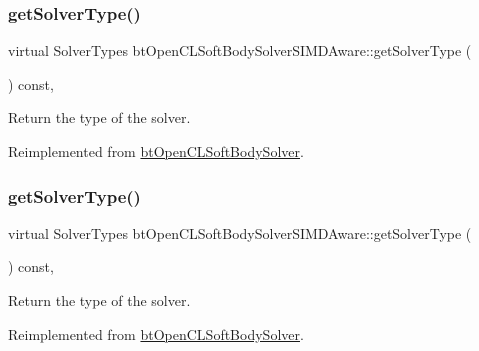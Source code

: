 \subsubsection{\texorpdfstring{get\+Solver\+Type()}{getSolverType()}\hspace{0.1cm}{\footnotesize\ttfamily [1/2]}}
{\footnotesize\ttfamily virtual Solver\+Types bt\+Open\+C\+L\+Soft\+Body\+Solver\+S\+I\+M\+D\+Aware\+::get\+Solver\+Type (\begin{DoxyParamCaption}{ }\end{DoxyParamCaption}) const\hspace{0.3cm}{\ttfamily [inline]}, {\ttfamily [virtual]}}

Return the type of the solver. 

Reimplemented from \hyperlink{classbtOpenCLSoftBodySolver_a2b643547caacc5c1daedff3f67a140fb}{bt\+Open\+C\+L\+Soft\+Body\+Solver}.

\mbox{\label{classbtOpenCLSoftBodySolverSIMDAware_a34d8e98c8756aeeac24554c18f06c0c1}} 
\subsubsection{\texorpdfstring{get\+Solver\+Type()}{getSolverType()}\hspace{0.1cm}{\footnotesize\ttfamily [2/2]}}
{\footnotesize\ttfamily virtual Solver\+Types bt\+Open\+C\+L\+Soft\+Body\+Solver\+S\+I\+M\+D\+Aware\+::get\+Solver\+Type (\begin{DoxyParamCaption}{ }\end{DoxyParamCaption}) const\hspace{0.3cm}{\ttfamily [inline]}, {\ttfamily [virtual]}}

Return the type of the solver. 

Reimplemented from \hyperlink{classbtOpenCLSoftBodySolver_a2b643547caacc5c1daedff3f67a140fb}{bt\+Open\+C\+L\+Soft\+Body\+Solver}.

\mbox{\label{classbtOpenCLSoftBodySolverSIMDAware_a5b9fb1bbf50012e83d8e2c38c5fc2afb}} 
